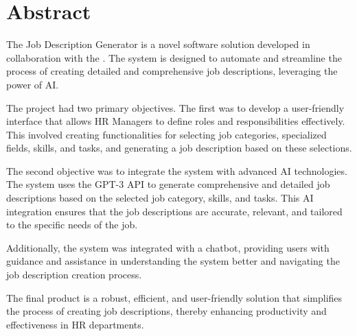 \section*{Abstract}
The Job Description Generator is a novel software solution developed in collaboration with the . The system is designed to automate and streamline the process of creating detailed and comprehensive job descriptions, leveraging the power of AI.

The project had two primary objectives. The first was to develop a user-friendly interface that allows HR Managers to define roles and responsibilities effectively. This involved creating functionalities for selecting job categories, specialized fields, skills, and tasks, and generating a job description based on these selections.

The second objective was to integrate the system with advanced AI technologies. The system uses the GPT-3 API to generate comprehensive and detailed job descriptions based on the selected job category, skills, and tasks. This AI integration ensures that the job descriptions are accurate, relevant, and tailored to the specific needs of the job.

Additionally, the system was integrated with a chatbot, providing users with guidance and assistance in understanding the system better and navigating the job description creation process.

The final product is a robust, efficient, and user-friendly solution that simplifies the process of creating job descriptions, thereby enhancing productivity and effectiveness in HR departments.


\newpage
